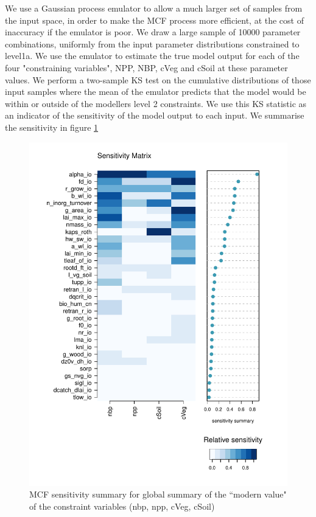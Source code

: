 \documentclass[gmd, manuscript]{copernicus}
\begin{document}
We use a Gaussian process emulator to allow a much larger set of samples from the input space, in order to make the MCF process more efficient, at the cost of inaccuracy if the emulator is poor. We draw a large sample of 10000 parameter combinations, uniformly from the input parameter distributions constrained to level1a. We use the emulator to estimate the true model output for each of the four "constraining variables", NPP, NBP, cVeg and cSoil at these parameter values. We perform a two-sample KS test on the cumulative distributions of those input samples where the mean of the emulator predicts that the model would be within or outside of the modellers level 2 constraints. We use this KS statistic as an indicator of the sensitivity of the model output to each input. We summarise the sensitivity in figure \ref{fig:MCF_sensmat_Yconst_level1a}

\begin{figure}[t]
\includegraphics[width=12cm]{./graphics/MCF_sensmat_Yconst_level1a}
\caption{MCF sensitivity summary for global summary of the ``modern value" of the constraint variables (nbp, npp, cVeg, cSoil)}
\label{fig:MCF_sensmat_Yconst_level1a}
\end{figure}
\end{document}
